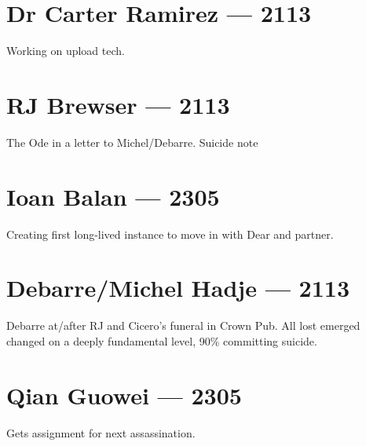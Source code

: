 \chapter*{Dr Carter Ramirez — 2113}

Working on upload tech.

\chapter*{RJ Brewser — 2113}

The Ode in a letter to Michel/Debarre. Suicide note

\chapter*{Ioan Balan — 2305}

Creating first long-lived instance to move in with Dear and partner.

\chapter*{Debarre/Michel Hadje — 2113}

Debarre at/after RJ and Cicero's funeral in Crown Pub. All lost emerged changed on a deeply fundamental level, 90\% committing suicide.

\chapter*{Qian Guowei — 2305}

Gets assignment for next assassination.
